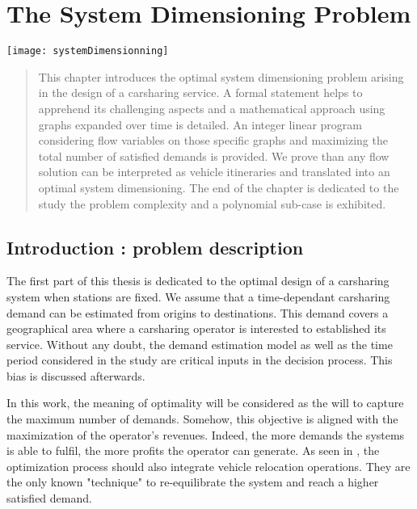 \chapter{The System Dimensioning Problem} \label{chap:sdp}
\minitoc
\vfill
\noindent
\begin{minipage}[c]{0.3\linewidth}
\texttt{[image: systemDimensionning]}
\end{minipage}
\hfill
\begin{minipage}[c]{0.7\linewidth}
\begin{abstract}
This chapter introduces the optimal system dimensioning problem arising in the design of a carsharing service.
A formal statement helps to apprehend its challenging aspects and a mathematical approach using graphs expanded over time is detailed.
An integer linear program considering flow variables on those specific graphs and maximizing the total number of satisfied demands is provided.
We prove than any flow solution can be interpreted as vehicle itineraries and translated into an optimal system dimensioning.
The end of the chapter is dedicated to the study the problem complexity and a polynomial sub-case is exhibited.
\end{abstract}
\end{minipage}

\newpage
\section{Introduction : problem description}
The first part of this thesis is dedicated to the optimal design of a carsharing system when stations are fixed.
We assume that a time-dependant carsharing demand can be estimated from origins to destinations.
This demand covers a geographical area where a carsharing operator is interested to established its service.
Without any doubt, the demand estimation model as well as the time period considered in the study are critical inputs in the decision process.
This bias is discussed afterwards.

\medskip
In this work, the meaning of optimality will be considered as the will to capture the maximum number of demands.
Somehow, this objective is aligned with the maximization of the operator's revenues.
Indeed, the more demands the systems is able to fulfil, the more profits the operator can generate.
As seen in \cite{jorge_testing_2012}, the optimization process should also integrate vehicle relocation operations.
They are the only known "technique" to re-equilibrate the system and reach a higher satisfied demand.

